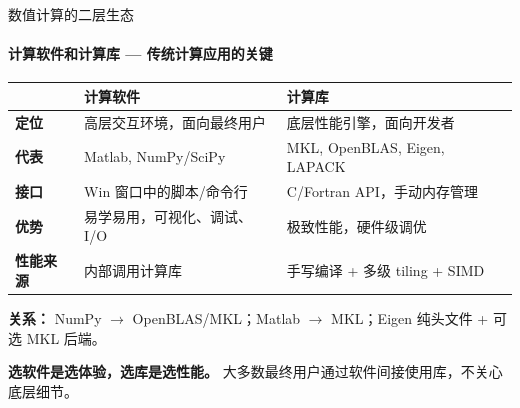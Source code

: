 \documentclass[12pt,aspectratio=169]{beamer}
\begin{document}
\begin{frame}[shrink]{数值计算的二层生态}
\framesubtitle{计算软件和计算库 — 传统计算应用的关键}

\small
\begin{center}
\renewcommand{\arraystretch}{1.3}
\begin{tabular}{@{}p{2.5cm} p{5cm} p{5cm}@{}}
\toprule
& \textbf{计算软件} & \textbf{计算库} \\
\midrule
\textbf{定位} & 高层交互环境，面向最终用户 & 底层性能引擎，面向开发者 \\
\textbf{代表} & Matlab, NumPy/SciPy & MKL, OpenBLAS, Eigen, LAPACK \\
\textbf{接口} & Win 窗口中的脚本/命令行 & C/Fortran API，手动内存管理 \\
\textbf{优势} & 易学易用，可视化、调试、I/O & 极致性能，硬件级调优 \\
\textbf{性能来源} & 内部调用计算库 & 手写编译 + 多级 tiling + SIMD \\
\bottomrule
\end{tabular}
\end{center}

\vspace{6pt}
\textbf{关系：} NumPy $\to$ OpenBLAS/MKL；Matlab $\to$ MKL；Eigen 纯头文件 + 可选 MKL 后端。

\vspace{2pt}
\textbf{选软件是选体验，选库是选性能。} 大多数最终用户通过软件间接使用库，不关心底层细节。
\end{frame}
\end{document}
